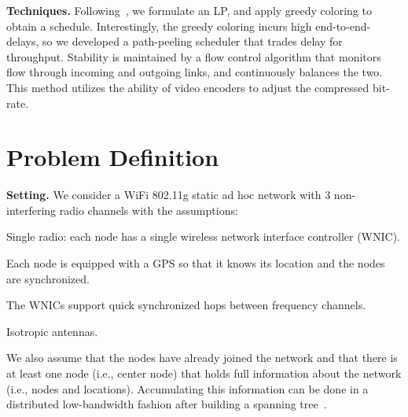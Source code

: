 \documentclass[11pt]{article}
\newenvironment{proof sketch}[1]{\noindent {\emph{Proof sketch of #1:}}}{\hfill \qed}
\begin{document}
\medskip
\noindent
\textbf{Techniques.}
Following~\cite{kumar2005algorithmic,alicherry2005joint11,buragohain2007improved,ChafekarCapacity,EMM11},
we formulate an LP, and apply greedy coloring to obtain a schedule.
Interestingly, the greedy coloring incurs high end-to-end-delays, so
we developed a path-peeling scheduler that trades delay for
throughput. Stability is maintained by a flow control algorithm that
monitors flow through incoming and outgoing links, and continuously
balances the two. This method utilizes the ability of video encoders
to adjust the compressed bit-rate.

\section{Problem Definition}\label{sec:problem}
\medskip
\noindent
\textbf{Setting.}  We consider a WiFi 802.11g static ad hoc network
with $3$ non-interfering radio channels with the assumptions:
\begin{inparaenum}[(i)]
\item Single radio: each node has a single wireless network interface
  controller (WNIC).
\item Each node is equipped with a GPS so that it knows its location
  and the nodes are synchronized.
\item The WNICs support quick synchronized hops between frequency
  channels.
\item Isotropic antennas.
\item We also assume that the nodes have already joined the network
  and that there is at least one node (i.e., center node) that holds
  full information about the network (i.e., nodes and locations).
  Accumulating this information can be done in a distributed
  low-bandwidth fashion after building a spanning
  tree~\cite{awerbuch1987optimal}.
\end{inparaenum}
\end{document}

